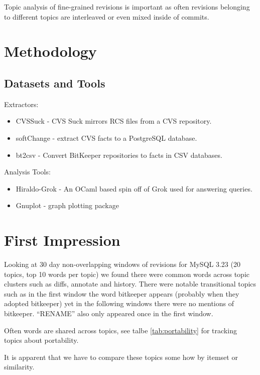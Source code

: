 \documentclass{report}
\begin{document}
Topic analysis of fine-grained revisions is important as often
revisions belonging to different topics are interleaved or even mixed
inside of commits. 


\section{Methodology}

\subsection{Datasets and Tools}

Extractors:
\begin{itemize}
\item CVSSuck - CVS Suck mirrors RCS files from a CVS repository. 
\item softChange - extract CVS facts to a PostgreSQL database.
\item bt2csv - Convert BitKeeper repositories to facts in CSV
  databases.
\end{itemize}

Analysis Tools:
\begin{itemize}
\item Hiraldo-Grok - An OCaml based spin off of Grok used for
  answering queries.
\item Gnuplot - graph plotting package
\end{itemize}

\section{First Impression}


Looking at 30 day non-overlapping windows of revisions for MySQL 3.23
(20 topics, top 10 words per topic) we found there were common words
across topic clusters such as diffs, annotate and history. There were
notable transitional topics such as in the first window the word
bitkeeper appears (probably when they adopted bitkeeper) yet in the
following windows there were no mentions of bitkeeper. ``RENAME'' also
only appeared once in the first window.

Often words are shared across topics, see talbe \ref{tab:portability}
for tracking topics about portability.

It is apparent that we have to compare these topics some how by
itemset or similarity.
\end{document}
